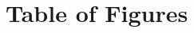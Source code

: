 \documentclass[PPFS.tex]{template/subfiles}
\begin{document}
\section{Table of Figures}

\renewcommand{\section}[2]{} %

\listoffigures{}
\end{document}
